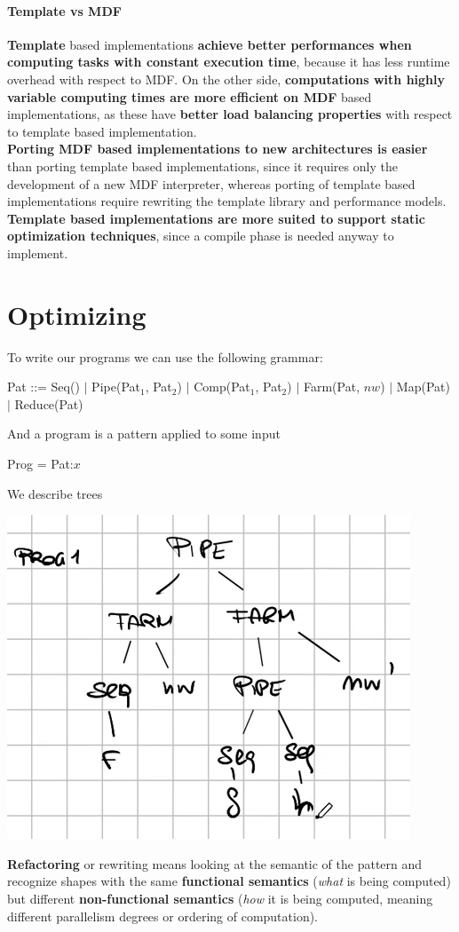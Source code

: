 \documentclass[10pt]{report}
\begin{document}
\paragraph{Template vs MDF} \textbf{Template} based implementations \textbf{achieve better performances when computing tasks with constant execution time}, because it has less runtime overhead with respect to MDF. On the other side, \textbf{computations with highly variable computing times  are more efficient on MDF} based implementations, as these have \textbf{better load balancing properties} with respect to template based implementation.\\
\textbf{Porting MDF based implementations to new architectures is easier} than porting template based implementations, since it requires only the development of a new MDF interpreter, whereas porting of template based implementations require rewriting the template library and performance models.\\
\textbf{Template based implementations are more suited to support static optimization techniques}, since a compile phase is needed anyway to implement.
\section{Optimizing}
To write our programs we can use the following grammar:
\begin{center}
Pat ::= Seq() $|$ Pipe(Pat$_1$, Pat$_2$) $|$ Comp(Pat$_1$, Pat$_2$) $|$ Farm(Pat, $nw$) $|$ Map(Pat) $|$ Reduce(Pat)
\end{center}
And a program is a pattern applied to some input
\begin{center}
Prog = Pat:$x$
\end{center}
We describe trees
\begin{center}
	\includegraphics[scale=0.5]{34.png}
\end{center}
\textbf{Refactoring} or rewriting means looking at the semantic of the pattern and recognize shapes with the same \textbf{functional semantics} (\textit{what} is being computed) but different \textbf{non-functional semantics} (\textit{how} it is being computed, meaning different parallelism degrees or ordering of computation).
\end{document}
